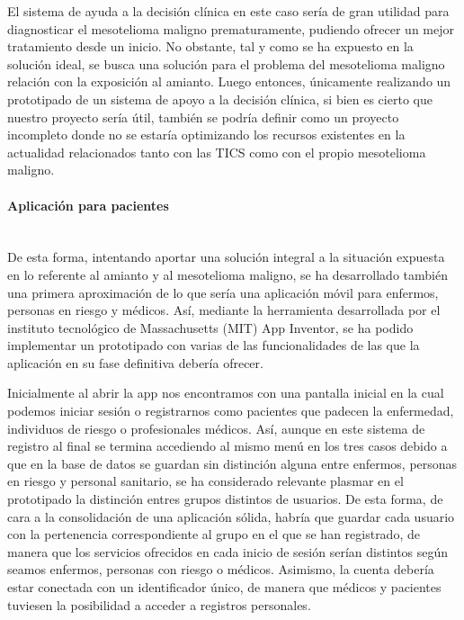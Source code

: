 \documentclass{article}
\newcommand{\subsubsubsection}[1]{\paragraph{#1}\mbox{}\\}
\begin{document}
El sistema de ayuda a la decisión clínica en este caso sería  de  gran
utilidad para  diagnosticar  el  mesotelioma  maligno  prematuramente,
pudiendo ofrecer un mejor tratamiento desde un inicio.	 No  obstante,
tal y como se ha expuesto en la solución ideal, se busca una  solución
para el problema del mesotelioma maligno relación con la exposición al
amianto.  Luego entonces, únicamente realizando un prototipado	de  un
sistema de apoyo a la decisión clínica, si bien es cierto que  nuestro
proyecto sería útil,  también  se  podría  definir  como  un  proyecto
incompleto donde no se estaría optimizando los recursos existentes  en
la actualidad relacionados tanto con  las  TICS  como  con  el	propio
mesotelioma maligno.

\subsubsubsection{Aplicación para pacientes}

De esta forma, intentando aportar una solución integral a la situación
expuesta en lo referente al amianto y al mesotelioma  maligno,	se  ha
desarrollado también una primera aproximación  de  lo  que  sería  una
aplicación móvil para enfermos, personas en riesgo  y  médicos.   Así,
mediante la herramienta desarrollada por el instituto  tecnológico  de
Massachusetts  (MIT)  App  Inventor,  se  ha  podido  implementar   un
prototipado con varias de las funcionalidades de las que la aplicación
en su fase definitiva debería ofrecer.

Inicialmente al abrir la app nos encontramos con una pantalla  inicial
en la cual podemos iniciar sesión o registrarnos  como	pacientes  que
padecen la enfermedad, individuos de riesgo o  profesionales  médicos.
Así, aunque en este sistema de registro al final se termina accediendo
al mismo menú en los tres casos debido a que en la base  de  datos  se
guardan sin distinción alguna entre enfermos,  personas  en  riesgo  y
personal  sanitario,  se  ha  considerado  relevante  plasmar  en   el
prototipado la distinción entres grupos distintos de usuarios. De esta
forma, de cara a la consolidación de una aplicación sólida, habría que
guardar cada usuario con la pertenencia correspondiente al grupo en el
que se han registrado, de manera que los servicios ofrecidos  en  cada
inicio de sesión serían distintos según seamos enfermos, personas  con
riesgo o médicos.  Asimismo, la cuenta debería estar conectada con  un
identificador único, de manera que médicos  y  pacientes  tuviesen  la
posibilidad a acceder a registros personales.
\end{document}
